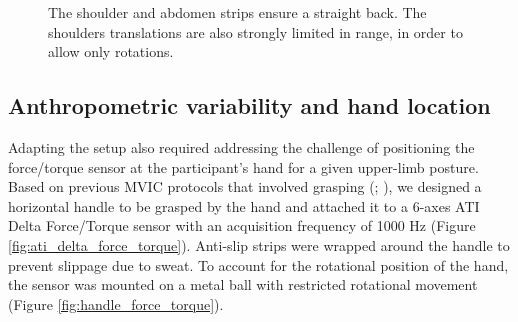 \begin{figure}[!htb]
\begin{minipage}{0.49\linewidth}
        \caption{The shoulder and abdomen strips ensure a straight back. The shoulders translations are also strongly limited in range, in order to allow only rotations.}
        \label{fig:chair_shoulder}
    \end{minipage}
\end{figure}

\subsection{Anthropometric variability and hand location}

Adapting the setup also required addressing the challenge of positioning the force/torque sensor at the participant's hand for a given upper-limb posture. Based on previous MVIC protocols that involved grasping (\cite{crosbyHandStrengthNormative1994}; \cite{watanabeShortTermReliabilityGrip2005}), we designed a horizontal handle to be grasped by the hand and attached it to a 6-axes ATI Delta Force/Torque sensor with an acquisition frequency of 1000 Hz (Figure \ref{fig:ati_delta_force_torque}). Anti-slip strips were wrapped around the handle to prevent slippage due to sweat. To account for the rotational position of the hand, the sensor was mounted on a metal ball with restricted rotational movement (Figure \ref{fig:handle_force_torque}).

